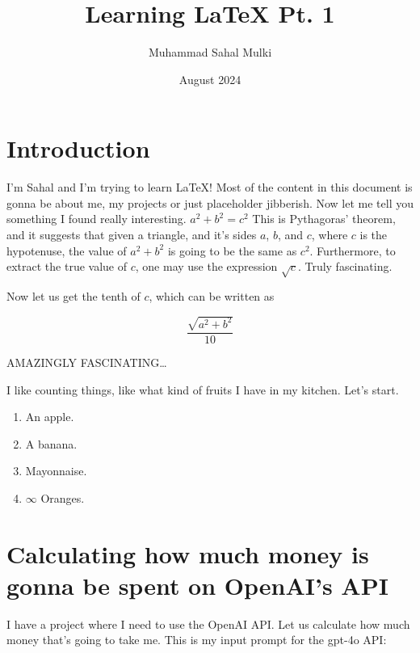 \documentclass{article}
\title{Learning LaTeX Pt. 1}
\author{Muhammad Sahal Mulki}
\date{August 2024}
\begin{document}
\maketitle

\section{Introduction}

I'm Sahal and I'm trying to learn \LaTeX! Most of the content in this document is gonna be about me, my projects or just placeholder jibberish. Now let me tell you something I found really interesting. $a^2 + b^2 = c^2$ This is Pythagoras' theorem, and it suggests that given a triangle, and it's sides $a$, $b$, and $c$, where $c$ is the hypotenuse, the value of $a^2 + b^2$ is going to be the same as $c^2$. Furthermore, to extract the true value of $c$, one may use the expression $\sqrt{c}$. Truly fascinating.

\bigskip

Now let us get the tenth of $c$, which can be written as

$$\frac{\sqrt{a^2 + b^2}}{10}$$

\bigskip

AMAZINGLY FASCINATING\dots

\bigskip

I like counting things, like what kind of fruits I have in my kitchen. Let's start.

\begin{enumerate}
    \item An apple.
    
    \item A banana.

    \item Mayonnaise.

    \item $\infty$ Oranges.
    
\end{enumerate}

\lipsum[1]

\section{Calculating how much money is gonna be spent on OpenAI's API}

I have a project where I need to use the OpenAI API. Let us calculate how much money that's going to take me. This is my input prompt for the gpt-4o API:
\end{document}
